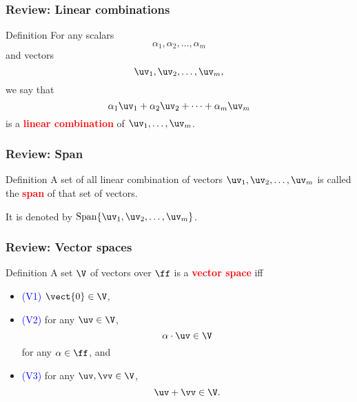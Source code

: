 

\begin{frame}
  \frametitle{Review: Linear combinations}

  \begin{block}{Definition}
    For any scalars
    \[
    \alpha_1,\alpha_2,\ldots,\alpha_m
    \]
    and vectors
    \[
    \uv_1,\uv_2,\ldots,\uv_m,
    \]
    we say that
    \[
    \alpha_1\uv_1 + \alpha_2\uv_2 + \cdots + \alpha_m \uv_m
    \]
    is a \textcolor{red}{\bf linear combination} of $\uv_1,\ldots,\uv_m$.
  \end{block}
\end{frame}

\begin{frame}
  \frametitle{Review: Span}

  \begin{block}{Definition}
    A set of all linear combination of vectors $\uv_1,\uv_2,\ldots,\uv_m$ is called the \textcolor{red}{\bf span} of that set of vectors.

    It is denoted by $\mathrm{Span} \{\uv_1,\uv_2,\ldots,\uv_m\}$.
  \end{block}
\end{frame}

\begin{frame}
  \frametitle{Review: Vector spaces}
  \begin{block}{Definition}
    A set $\V$ of vectors over $\ff$ is a \textcolor{red}{\bf vector space} iff
    \begin{itemize}
    \item \textcolor{blue}{(V1)} $\vect{0}\in\V$,
    \item \textcolor{blue}{(V2)} for any $\uv\in\V$,
      \[
      \alpha\cdot\uv\in\V
      \]
      for any
      $\alpha\in\ff$, and
    \item \textcolor{blue}{(V3)} for any $\uv,\vv\in\V$,
      \[
      \uv+\vv\in\V.
      \]
    \end{itemize}
  \end{block}
\end{frame}

